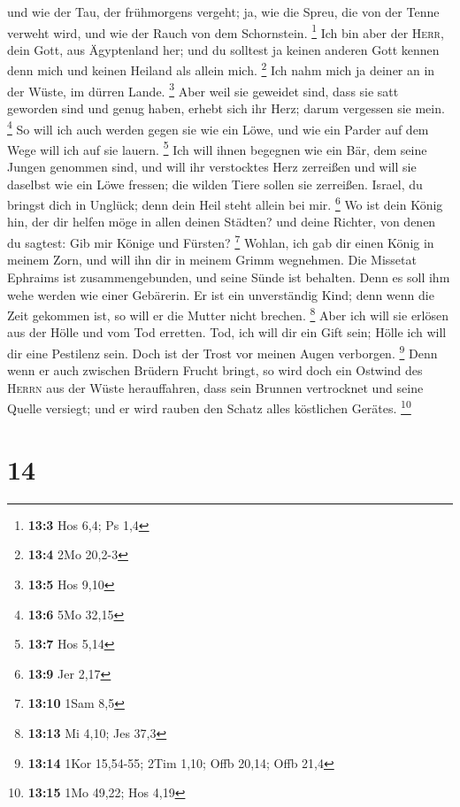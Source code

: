 und wie der Tau, der frühmorgens vergeht; ja, wie die Spreu, die von der
Tenne verweht wird, und wie der Rauch von dem Schornstein. \footnote{\textbf{13:3}
  Hos 6,4; Ps 1,4}  Ich bin aber der \textsc{Herr}, dein
Gott, aus Ägyptenland her; und du solltest ja keinen anderen Gott kennen
denn mich und keinen Heiland als allein mich. \footnote{\textbf{13:4}
  2Mo 20,2-3}  Ich nahm mich ja deiner an in der Wüste, im
dürren Lande. \footnote{\textbf{13:5} Hos 9,10}  Aber weil
sie geweidet sind, dass sie satt geworden sind und genug haben, erhebt
sich ihr Herz; darum vergessen sie mein. \footnote{\textbf{13:6} 5Mo
  32,15}  So will ich auch werden gegen sie wie ein Löwe,
und wie ein Parder auf dem Wege will ich auf sie lauern. \footnote{\textbf{13:7}
  Hos 5,14}  Ich will ihnen begegnen wie ein Bär, dem
seine Jungen genommen sind, und will ihr verstocktes Herz zerreißen und
will sie daselbst wie ein Löwe fressen; die wilden Tiere sollen sie
zerreißen.  Israel, du bringst dich in Unglück; denn dein
Heil steht allein bei mir. \footnote{\textbf{13:9} Jer 2,17}
 Wo ist dein König hin, der dir helfen möge in allen
deinen Städten? und deine Richter, von denen du sagtest: Gib mir Könige
und Fürsten? \footnote{\textbf{13:10} 1Sam 8,5}  Wohlan,
ich gab dir einen König in meinem Zorn, und will ihn dir in meinem Grimm
wegnehmen.  Die Missetat Ephraims ist zusammengebunden,
und seine Sünde ist behalten.  Denn es soll ihm wehe
werden wie einer Gebärerin. Er ist ein unverständig Kind; denn wenn die
Zeit gekommen ist, so will er die Mutter nicht brechen. \footnote{\textbf{13:13}
  Mi 4,10; Jes 37,3}  Aber ich will sie erlösen aus der
Hölle und vom Tod erretten. Tod, ich will dir ein Gift sein; Hölle ich
will dir eine Pestilenz sein. Doch ist der Trost vor meinen Augen
verborgen. \footnote{\textbf{13:14} 1Kor 15,54-55; 2Tim 1,10; Offb
  20,14; Offb 21,4}  Denn wenn er auch zwischen Brüdern
Frucht bringt, so wird doch ein Ostwind des \textsc{Herrn} aus der Wüste
herauffahren, dass sein Brunnen vertrocknet und seine Quelle versiegt;
und er wird rauben den Schatz alles köstlichen Gerätes. \footnote{\textbf{13:15}
  1Mo 49,22; Hos 4,19}

\hypertarget{section-5}{%
\section{14}\label{section-5}}

